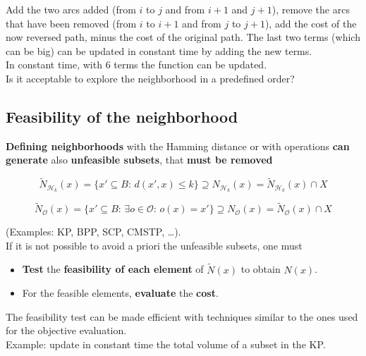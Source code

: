 Add the two arcs added (from $i$ to $j$ and from $i+1$ and $j+1$), remove the arcs that have been removed (from $i$ to $i+1$ and from $j$ to $j+1$), add the cost of the now reversed path, minus the cost of the original path. The last two terms (which can be big) can be updated in constant time by adding the new terms.\\
In constant time, with $6$ terms the function can be updated.\\

Is it acceptable to explore the neighborhood in a predefined order?

\newpage

\subsection{Feasibility of the neighborhood}
\textbf{Defining neighborhoods} with the Hamming distance or with operations \textbf{can generate} also \textbf{unfeasible subsets}, that \textbf{must be removed}

$$ \tilde{N}_{\mathcal{H}_k} (x) = \{x' \subseteq B : \, d (x', x) \leq k \} \supseteq N_{\mathcal{H}_k} (x) = \tilde{N}_{\mathcal{H}_k} (x) \cap X $$

$$ \tilde{N}_{\mathcal{O}} (x) = \{ x' \subseteq B : \, \exists o \in \mathcal{O} : \, o (x) = x' \} \supseteq N_{\mathcal{O}} (x) = \tilde{N}_{\mathcal{O}} (x) \cap X $$

(Examples: KP, BPP, SCP, CMSTP, \dots).\\

If it is not possible to avoid a priori the unfeasible subsets, one must
\begin{itemize}
	\item \textbf{Test} the \textbf{feasibility of each element} of $\tilde{N} (x)$ to obtain $N (x)$.\\
	
	\item For the feasible elements, \textbf{evaluate} the \textbf{cost}.\\
\end{itemize}

The feasibility test can be made efficient with techniques similar to the ones used for the objective evaluation.\\

Example: update in constant time the total volume of a subset in the KP.\\

\newpage


